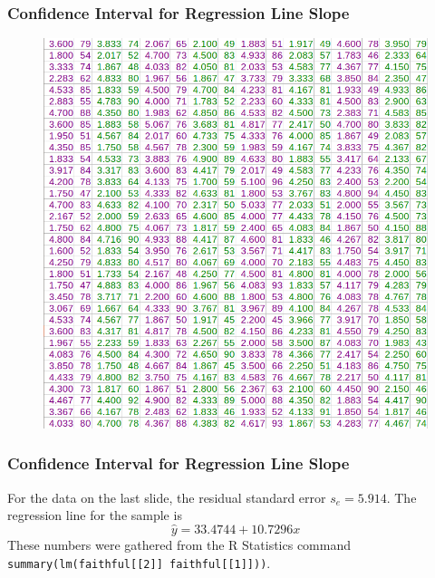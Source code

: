 \documentclass[xcolor=dvipsnames]{beamer}
\begin{document}
\begin{frame}
  \frametitle{Confidence Interval for Regression Line Slope}
\begin{figure}[h]
\includegraphics[scale=.35]{./diagrams/faithful.png}
\end{figure}
\end{frame}

\begin{frame}
  \frametitle{Confidence Interval for Regression Line Slope}
  For the data on the last slide, the residual standard error
  $s_{e}=5.914$. The regression line for the sample is
  \begin{equation}
    \label{eq:eiheelut}
    \hat{y}=33.4744+10.7296x
  \end{equation}
These numbers were gathered from the R Statistics command
\texttt{summary(lm(faithful[[2]]~faithful[[1]]))}. 
\end{frame}
\end{document}

